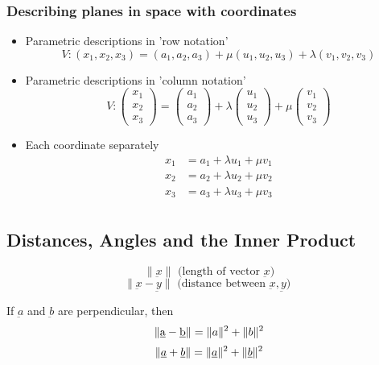 \subsubsection{Describing planes in space with coordinates}
\begin{itemize}
    \item Parametric descriptions in 'row notation'
    $$ V : (x_1,x_2,x_3) = (a_1,a_2,a_3) + \mu(u_1,u_2,u_3) + \lambda(v_1,v_2,v_3) $$

    \item Parametric descriptions in 'column notation'
    $$
    V : \begin{pmatrix}
        x_1 \\ x_2 \\ x_3
    \end{pmatrix} = \begin{pmatrix}
        a_1 \\ a_2 \\ a_3
    \end{pmatrix} + \lambda \begin{pmatrix}
        u_1 \\ u_2 \\ u_3
    \end{pmatrix} + \mu \begin{pmatrix}
        v_1 \\ v_2 \\ v_3
    \end{pmatrix}
    $$

    \item Each coordinate separately
    \begin{align*}
        x_1 &= a_1 + \lambda u_1 + \mu v_1 \\
        x_2 &= a_2 + \lambda u_2 + \mu v_2 \\
        x_3 &= a_3 + \lambda u_3 + \mu v_3 \\
    \end{align*}
\end{itemize}

\subsection{Distances, Angles and the Inner Product}

\begin{definition}[]
    $$\lVert\underbar{x}\rVert \text{ (length of vector $\underbar{x}$)}$$
    $$ \lVert\underbar{x} - \underbar{y} \rVert \text{ (distance between $\underbar{x},\underbar{y}$) } $$
    \begin{nb}
        If $ \underbar{a} $ and $ \underbar{b} $ are perpendicular, then
        $$ \lVert\underbar{a} - \underbar{b} \rVert = \lVert a \rVert^2 + \lVert b \rVert^2 $$
        $$ \lVert \underline{a} + \underline{b} \rVert = \lVert \underline{a} \rVert^2 + \lVert \underline{b} \rVert^2 $$
    \end{nb}
\end{definition}


